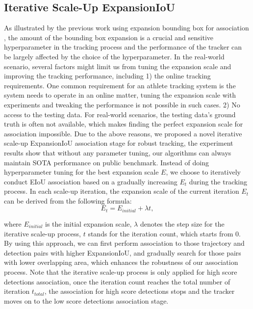 \documentclass[10pt,twocolumn,letterpaper]{article}
\begin{document}
\subsection{Iterative Scale-Up ExpansionIoU}\label{sec:iterative}
As illustrated by the previous work using expansion bounding box for association \cite{yang2023hard}, the amount of the bounding box expansion is a crucial and sensitive hyperparameter in the tracking process and the performance of the tracker can be largely affected by the choice of the hyperparameter. In the real-world scenario, several factors might limit us from tuning the expansion scale and improving the tracking performance, including 1) the online tracking requirements. One common requirement for an athlete tracking system is the system needs to operate in an online matter, tuning the expansion scale with experiments and tweaking the performance is not possible in such cases. 2) No access to the testing data. For real-world scenarios, the testing data's ground truth is often not available, which makes finding the perfect expansion scale for association impossible. Due to the above reasons, we proposed a novel iterative scale-up ExpansionIoU association stage for robust tracking, the experiment results show that without any parameter tuning, our algorithms can always maintain SOTA performance on public benchmark.
Instead of doing hyperparameter tuning for the best expansion scale $E$, we choose to iteratively conduct EIoU association based on a gradually increasing $E_{t}$ during the tracking process. In each scale-up iteration, the expansion scale of the current iteration $E_{t}$ can be derived from the following formula:
\begin{equation}
    E_{t} = E_{initial} + \lambda t,
\end{equation}

\noindent where $E_{initial}$ is the initial expansion scale, $\lambda$ denotes the step size for the iterative scale-up process, $t$ stands for the iteration count, which starts from 0. By using this approach, we can first perform association to those trajectory and detection pairs with higher ExpansionIoU, and gradually search for those pairs with lower overlapping area, which enhances the robustness of our association process. Note that the iterative scale-up process is only applied for high score detections association, once the iteration count reaches the total number of iteration $t_{total}$, the association for high score detections stops and the tracker moves on to the low score detections association stage.
\end{document}

